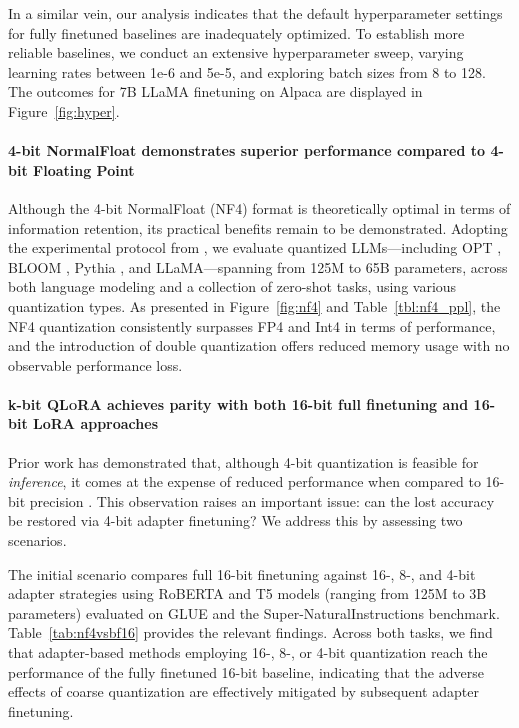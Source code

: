 In a similar vein, our analysis indicates that the default hyperparameter settings for fully finetuned baselines are inadequately optimized. To establish more reliable baselines, we conduct an extensive hyperparameter sweep, varying learning rates between 1e-6 and 5e-5, and exploring batch sizes from 8 to 128. The outcomes for 7B LLaMA finetuning on Alpaca are displayed in Figure~\ref{fig:hyper}.

\paragraph{4-bit NormalFloat demonstrates superior performance compared to 4-bit Floating Point}

Although the 4-bit NormalFloat (NF4) format is theoretically optimal in terms of information retention, its practical benefits remain to be demonstrated. Adopting the experimental protocol from \citet{dettmers2022case}, we evaluate quantized LLMs—including OPT \citep{zhang2022opt}, BLOOM \cite{scao2022bloom}, Pythia \cite{biderman2023pythia}, and LLaMA—spanning from 125M to 65B parameters, across both language modeling and a collection of zero-shot tasks, using various quantization types. As presented in Figure~\ref{fig:nf4} and Table~\ref{tbl:nf4_ppl}, the NF4 quantization consistently surpasses FP4 and Int4 in terms of performance, and the introduction of double quantization offers reduced memory usage with no observable performance loss.

\paragraph{k-bit \textsc{QLoRA} achieves parity with both 16-bit full finetuning and 16-bit LoRA approaches}

Prior work has demonstrated that, although 4-bit quantization is feasible for \emph{inference}, it comes at the expense of reduced performance when compared to 16-bit precision \citep{dettmers2022case,frantar2022gptq}. This observation raises an important issue: can the lost accuracy be restored via 4-bit adapter finetuning? We address this by assessing two scenarios.

The initial scenario compares full 16-bit finetuning against 16-, 8-, and 4-bit adapter strategies using RoBERTA and T5 models (ranging from 125M to 3B parameters) evaluated on GLUE and the Super-NaturalInstructions benchmark. Table~\ref{tab:nf4vsbf16} provides the relevant findings. Across both tasks, we find that adapter-based methods employing 16-, 8-, or 4-bit quantization reach the performance of the fully finetuned 16-bit baseline, indicating that the adverse effects of coarse quantization are effectively mitigated by subsequent adapter finetuning.

